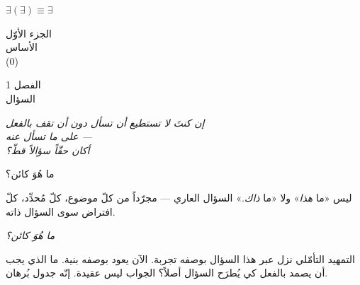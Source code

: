 \documentclass[10pt, openany, oneside]{book}
\renewcommand{\normalsize}{\fontsize{10}{13}\selectfont}
\renewcommand{\large}{\fontsize{11.5}{14}\selectfont}
\renewcommand{\LARGE}{\fontsize{15}{18}\selectfont}
\renewcommand{\huge}{\fontsize{17}{21}\selectfont}
\begin{document}
\begin{center}
    $\exists(\exists) \equiv \exists$
\end{center}

%
%

\newpage
\thispagestyle{empty}
\vspace*{\fill}
\begin{center}
    {\LARGE الجزء الأوّل}\\[1em]
    {\large الأساس}\\[0.5em]
    {\normalsize (0)}
\end{center}
\vspace*{\fill}
\newpage

%
%
%

\newpage

\begin{center}
    {\huge الفصل 1}\\[0.3em]
    {\large السؤال}
\end{center}

\vspace{1.5em}

\begin{center}
    \itshape
    إن كنتَ لا تستطيع أن تسأل دون أن تقف بالفعل\\
    على ما تسأل عنه ---\\
    أكان حقّاً سؤالاً قطّ؟
\end{center}

\vspace{2em}


\noindent ما هُوَ كائن؟

ليس «ما \textit{هذا}» ولا «ما \textit{ذاك}.» السؤال العاري --- مجرّداً من كلّ موضوع، كلّ مُحدِّد، كلّ افتراض سوى السؤال ذاته.

\textit{ما هُوَ كائن؟}

التمهيد التأمّلي نزل عبر هذا السؤال بوصفه تجربة. الآن يعود بوصفه بنية. ما الذي يجب أن يصمد بالفعل كي يُطرَح السؤال أصلاً؟ الجواب ليس عقيدة. إنّه جدول بُرهان.
\end{document}
